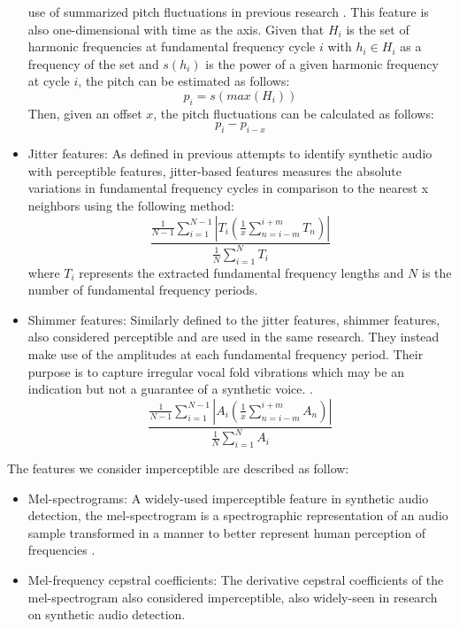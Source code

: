 \documentclass{article}
\begin{document}
\begin{itemize}
					use of summarized pitch fluctuations in previous research
					\cite{khanjani_learning_2023}. This feature is also one-dimensional with time
					as the axis. Given that \(H_{i}\) is the set of harmonic frequencies at
					fundamental frequency cycle \(i\) with \(h_{i} \in H_{i}\) as a frequency of
					the set and \(s(h_{i})\) is the power of a given harmonic frequency at cycle
					\(i\), the pitch can be estimated as follows:
					\[p_{i} = s(max(H_{i}))\]
					Then, given an offset \(x\), the pitch fluctuations can be calculated as
					follows:
					\[p_{i}-p_{i-x}\]
				\item
					Jitter features: As defined in previous attempts to identify synthetic audio
					\cite{chaiwongyen_deepfake-speech_2023} with perceptible features,
					jitter-based features measures the absolute variations in fundamental
					frequency cycles in comparison to the nearest x neighbors using the following
					method:
					\[ \frac{ \frac{1}{N-1}\sum_{i=1}^{N-1}|T_{i}
						(\frac{1}{x}\sum_{n=i-m}^{i+m}T_{n})|}
					{\frac{1}{N}\sum_{i=1}^{N}T_{i}} \]
					where \(T_{i}\) represents the extracted fundamental frequency lengths and
					\(N\) is the number of fundamental frequency periods.
				\item
					Shimmer features: Similarly defined to the jitter features, shimmer features,
					also considered perceptible and are used in the same research. They instead
					make use of the amplitudes at each fundamental frequency period. Their purpose
					is to capture irregular vocal fold vibrations which may be an indication but
					not a guarantee of a synthetic voice.
					\cite{chaiwongyen_deepfake-speech_2023}.
					\[ \frac{ \frac{1}{N-1}\sum_{i=1}^{N-1}|A_{i}
						(\frac{1}{x}\sum_{n=i-m}^{i+m}A_{n})|}
					{\frac{1}{N}\sum_{i=1}^{N}A_{i}} \]
			\end{itemize}
			The features we consider imperceptible are described as follow:
			\begin{itemize}
				\item
					Mel-spectrograms: A widely-used imperceptible feature in synthetic audio
					detection, the mel-spectrogram is a spectrographic representation of an audio
					sample transformed in a manner to better represent human perception of
					frequencies \cite{qais_deepfake_2022}.
				\item
					Mel-frequency cepstral coefficients: The derivative cepstral coefficients of
					the mel-spectrogram also considered imperceptible, also widely-seen in
					research on synthetic audio detection.
			\end{itemize}
\end{document}
